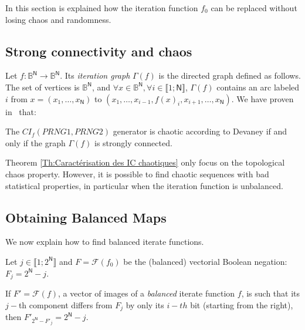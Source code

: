 \documentclass[conference]{IEEEtran}
\begin{document}
In this section is explained how the iteration function $f_0$ can be replaced without losing chaos and randomness.

\subsection{Strong connectivity and chaos}


Let $f:\mathds{B}^\mathsf{N} \rightarrow \mathds{B}^\mathsf{N}$. Its
{\emph{iteration graph}} $\Gamma(f)$ is the directed graph defined as follows. 
The set of vertices is
$\mathds{B}^\mathsf{N}$, and $\forall x\in\mathds{B}^\mathsf{N}, \forall i\in \llbracket1;\mathsf{N}\rrbracket$,
$\Gamma(f)$ contains an arc labeled $i$ from $x = (x_1, \hdots, x_\mathsf{N})$ to $(x_1, \hdots, x_{i-1}, f(x)_i, x_{i+1}, \hdots, x_\mathsf{N})$. 
We have proven in~\cite{GuyeuxThese10} that:


\begin{theorem}
\label{Th:Caractérisation   des   IC   chaotiques}
The $CI_f(PRNG1,PRNG2)$ generator is chaotic according to Devaney if and only if the graph $\Gamma(f)$ is strongly connected.
\end{theorem}

Theorem \ref{Th:Caractérisation   des   IC   chaotiques} only focus on the topological chaos property.
However, it is possible to find chaotic sequences with bad statistical properties, in particular when the iteration function is unbalanced.


\subsection{Obtaining Balanced Maps}
\label{The generation of pseudo-random sequence}



We now explain how to find balanced iterate functions.

\begin{theorem}
Let $j \in \llbracket 1; 2^\mathsf{N} \rrbracket$ and $F = \mathcal{F}(f_0)$ be the (balanced) vectorial Boolean negation: $F_{j}=2^\mathsf{N}-j$.

If $F' = \mathcal{F}(f)$, a vector of images of a \emph{balanced} iterate function $f$, is such that its $j-$th component differs from $F_j$ by only its $i-th$ bit (starting from the right), then $F'_{2^\mathsf{N}-F'_j}=2^\mathsf{N}-j$.
\end{theorem}
\end{document}
